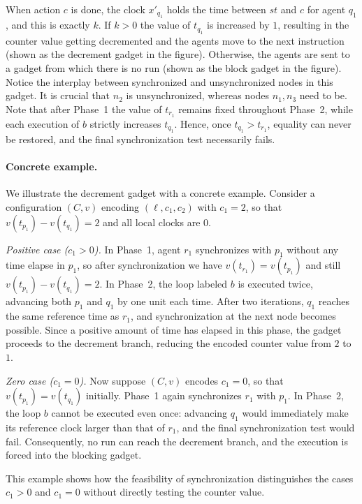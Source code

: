 When action $c$ is done, the clock $x'_{q_1}$ holds the time between
$st$ and $c$ for agent $q_1$, and this is exactly $k$. If $k > 0$ the
value of $t_{q_1}$ is increased by $1$, resulting in the counter value
getting decremented and the agents move to the next instruction (shown
as the decrement gadget in the figure). Otherwise, the agents are sent
to a gadget from which there is no run (shown as the block gadget in
the figure).
Notice the interplay between synchronized and unsynchronized nodes in
this gadget. It is crucial that $n_2$ is unsynchronized, whereas
nodes $n_1, n_3$ need to be.
Note that after Phase~1 the value of $t_{r_1}$ remains fixed throughout
Phase~2, while each execution of $b$ strictly increases $t_{q_1}$.
Hence, once $t_{q_1} > t_{r_1}$, equality can never be restored, and the
final synchronization test necessarily fails.


\paragraph{Concrete example.}
We illustrate the decrement gadget with a concrete example.  Consider a
configuration $(C,v)$ encoding $(\ell,c_1,c_2)$ with $c_1=2$, so that
$v(t_{p_1}) - v(t_{q_1}) = 2$ and all local clocks are $0$.

\emph{Positive case ($c_1>0$).}
In Phase~1, agent $r_1$ synchronizes with $p_1$ without any time elapse in $p_1$,
so after synchronization we have
$v(t_{r_1}) = v(t_{p_1})$ and still $v(t_{p_1}) - v(t_{q_1}) = 2$.
In Phase~2, the loop labeled $b$ is executed twice, advancing both $p_1$ and
$q_1$ by one unit each time.  After two iterations, $q_1$ reaches the same
reference time as $r_1$, and synchronization at the next node becomes possible.
Since a positive amount of time has elapsed in this phase, the gadget proceeds
to the decrement branch, reducing the encoded counter value from $2$ to $1$.

\emph{Zero case ($c_1=0$).}
Now suppose $(C,v)$ encodes $c_1=0$, so that
$v(t_{p_1}) = v(t_{q_1})$ initially.  Phase~1 again synchronizes $r_1$ with
$p_1$.  In Phase~2, the loop $b$ cannot be executed even once: advancing $q_1$
would immediately make its reference clock larger than that of $r_1$, and the
final synchronization test would fail.  Consequently, no run can reach the
decrement branch, and the execution is forced into the blocking gadget.

This example shows how the feasibility of synchronization distinguishes the
cases $c_1>0$ and $c_1=0$ without directly testing the counter value.

